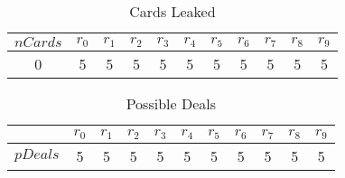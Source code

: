 \documentclass{article}
\begin{document}
\begin{table}[ht] 
\begin{tabular}{ | c || c | c | c | c | c | c | c | c | c | c  | } 
 \hline 
$nCards$  & $r_{0}$ & $r_{1}$ & $r_{2}$ & $r_{3}$ & $r_{4}$ & $r_{5}$ & $r_{6}$ & $r_{7}$ & $r_{8}$ & $r_{9}$ \\ 
 \hline 
0 & 5 & 5 & 5 & 5 & 5 & 5 & 5 & 5 & 5 & 5 \\ 
\hline
\end{tabular}
\caption{Cards Leaked}
\label{cLeaked-0}
\end{table}

\begin{table}[ht] 
\begin{tabular}{ | c || c | c | c | c | c | c | c | c | c | c  | } 
\hline$\;$   & $r_{0}$ & $r_{1}$ & $r_{2}$ & $r_{3}$ & $r_{4}$ & $r_{5}$ & $r_{6}$ & $r_{7}$ & $r_{8}$ & $r_{9}$ \\ 
\hline 
$pDeals$ & 5  & 5  & 5  & 5  & 5  & 5  & 5  & 5  & 5  & 5  \\ 
\hline 
\end{tabular}
\caption{Possible Deals}
\label{pDeals-0}
\end{table}

\appendix




\end{document}
